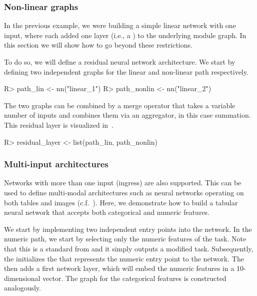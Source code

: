 \documentclass[article]{jss}
\theoremstyle{definition}
\begin{document}
\subsubsection{Non-linear graphs}\label{sec:complex-architectures}

In the previous example, we were building a simple linear network with one input, where each  added one layer (i.e., a ) to the underlying module graph.
In this section we will show how to go beyond these restrictions.

To do so, we will define a residual neural network architecture.
We start by defining two independent graphs for the linear and non-linear path respectively.

\begin{CodeInput}
R> path_lin <- nn("linear_1")
R> path_nonlin <- nn("linear_2") %
\end{CodeInput}

The two graphs can be combined by a merge operator that takes a variable number of inputs and combines them via an aggregator, in this case summation.
This residual layer is visualized in~.

\begin{CodeInput}
R> residual_layer <- list(path_lin, path_nonlin) %
\end{CodeInput}

\subsubsection{Multi-input architectures}

Networks with more than one input (ingress) are also supported.
This can be used to define multi-modal architectures such as neural networks operating on both tables and images (c.f.~).
Here, we demonstrate how to build a tabular neural network that accepts both categorical and numeric features.

We start by implementing two independent entry points into the network.
In the numeric path, we start by selecting only the numeric features of the task.
Note that this is a standard  from  and it simply outputs a modified task.
Subsequently, the  initializes the  that represents the numeric entry point to the network.
The   \citep{gorishniy2021revisiting} then adds a first network layer, which will embed the numeric features in a 10-dimensional vector.
The graph for the categorical features is constructed analogously.
\end{document}
